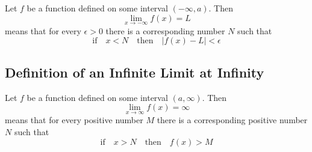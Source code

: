 Let \(f\) be a function defined on some interval \((-\infty, a)\). Then
$$ \lim_{x \to -\infty}f(x)=L$$
means that for every \(\epsilon>0\) there is a corresponding number \(N\) such that 
$$ \text{if} \quad x<N \quad \text{then} \quad \left| f(x)-L \right| <\epsilon$$ 

\subsection*{Definition of an Infinite Limit at Infinity}

Let \(f\) be a function defined on some interval \((a, \infty)\). Then
$$ \lim_{x \to \infty}f(x)=\infty$$
means that for every positive number \(M\) there is a corresponding positive number \(N\) such that 
$$ \text{if} \quad x>N \quad \text{then} \quad f(x)>M$$ 

